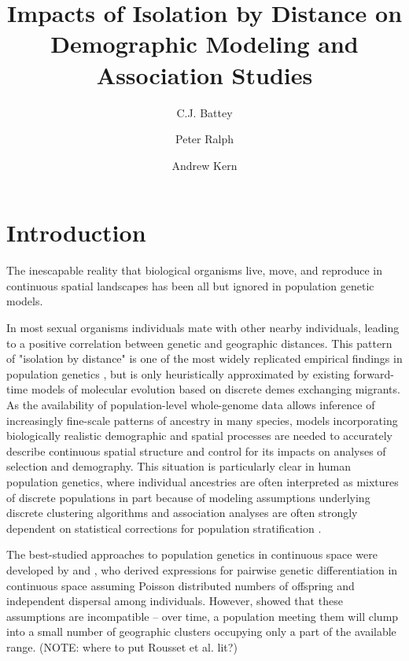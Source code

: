\documentclass[9pt,twocolumn,twoside,lineno]{gsajnl}
\title{Impacts of Isolation by Distance on Demographic Modeling and Association Studies}
\author[$\ast$,1]{C.J. Battey}
\author[$\ast$]{Peter Ralph}
\author[$\ast$]{Andrew Kern}
\affil[$\ast$]{University of Oregon Dept. Biology, Institute for Ecology Evolution}
\begin{document}
\maketitle
\thispagestyle{firststyle}
\marginmark
\firstpagefootnote


\vspace{-35pt}%

\section{Introduction}
The inescapable reality that biological organisms live, move, and reproduce in continuous spatial landscapes has been all but ignored in population genetic models. 

In most sexual organisms individuals mate with other nearby individuals, leading to a positive correlation between genetic and geographic distances. This pattern of "isolation by distance" \citep{Wright1943} is one of the most widely replicated empirical findings in population genetics \citep{Chen2017,Jay2012,Sharbel2000}, but is only heuristically approximated by existing forward-time models of molecular evolution based on discrete demes exchanging migrants. As the availability of population-level whole-genome data allows inference of increasingly fine-scale patterns of ancestry in many species, models incorporating biologically realistic demographic and spatial processes are needed to accurately describe continuous spatial structure and control for its impacts on analyses of selection and demography. This situation is particularly clear in human population genetics, where individual ancestries are often interpreted as mixtures of discrete populations in part because of modeling assumptions underlying discrete clustering algorithms and association analyses are often strongly dependent on statistical corrections for population stratification \citep{Berg2018}.  

The best-studied approaches to population genetics in continuous space were developed by \citep{Wright1943} and \citep{Malecot1948}, who derived expressions for pairwise genetic differentiation in continuous space assuming Poisson distributed numbers of offspring and independent dispersal among individuals. However, \citep{Felsenstein1975} showed that these assumptions are incompatible -- over time, a population meeting them will clump into a small number of geographic clusters occupying only a part of the available range. (NOTE: where to put Rousset et al. lit?)
\end{document}
